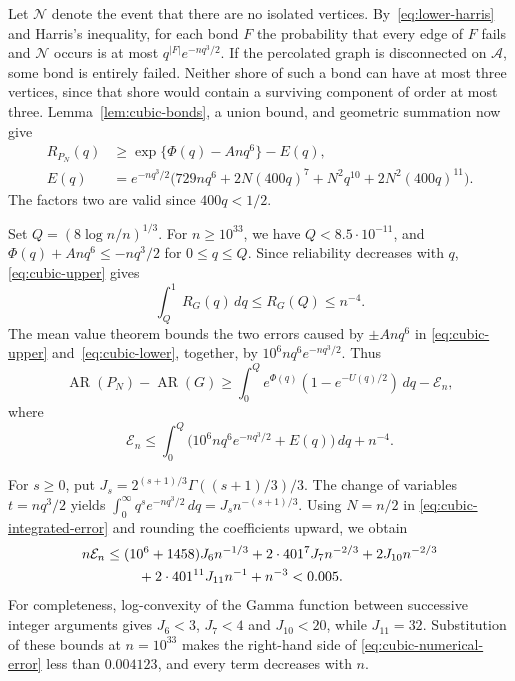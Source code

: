 \documentclass[11pt,reqno]{amsart}
\theoremstyle{remark}
\numberwithin{equation}{section}
\newcommand{\AR}{\operatorname{AR}}
\begin{document}
Let $\mathcal N$ denote the event that there are no isolated vertices. By~\eqref{eq:lower-harris} and Harris's inequality, for each bond $F$ the probability that every edge of $F$ fails and $\mathcal N$ occurs is at most $q^{|F|}e^{-nq^3/2}$. If the percolated
graph is disconnected on $\mathcal A$, some bond is entirely failed.
Neither shore of such a bond can have at most three vertices, since
that shore would contain a surviving component of order at most
three. Lemma~\ref{lem:cubic-bonds}, a union bound, and geometric
summation now give
\begin{align}
 R_{P_N}(q)&\ge \exp\{\Phi(q)-Anq^6\}-E(q),
       \label{eq:cubic-lower}\\
 E(q)&=e^{-nq^3/2}\bigl(729nq^6+2N(400q)^7
                    +N^2q^{10}+2N^2(400q)^{11}\bigr).
       \label{eq:cubic-error}
\end{align}
The factors two are valid since $400q<1/2$.

Set $Q=(8\log n/n)^{1/3}$. For $n\ge10^{33}$, we have
$Q<8.5\cdot10^{-11}$, and $\Phi(q)+Anq^6\le-nq^3/2$ for
$0\le q\le Q$. Since reliability decreases with $q$,
\eqref{eq:cubic-upper} gives
\begin{equation}\label{eq:cubic-tail}
 \int_Q^1 R_G(q)\,dq\le R_G(Q)\le n^{-4}.
\end{equation}
The mean value theorem bounds the two errors caused by $\pm Anq^6$
in \eqref{eq:cubic-upper} and~\eqref{eq:cubic-lower}, together, by
$10^6nq^6e^{-nq^3/2}$. Thus
\begin{equation}\label{eq:cubic-comparison}
 \AR(P_N)-\AR(G)
 \ge \int_0^Q e^{\Phi(q)}(1-e^{-U(q)/2})\,dq-\mathcal E_n,
\end{equation}
where
\begin{equation}\label{eq:cubic-integrated-error}
 \mathcal E_n\le
 \int_0^Q\bigl(10^6nq^6e^{-nq^3/2}+E(q)\bigr)\,dq+n^{-4}.
\end{equation}

For $s\ge0$, put
$J_s=2^{(s+1)/3}\Gamma((s+1)/3)/3$. The change of variables
$t=nq^3/2$ yields
$\int_0^\infty q^s e^{-nq^3/2}\,dq=J_sn^{-(s+1)/3}$.
Using $N=n/2$ in \eqref{eq:cubic-integrated-error} and rounding the
coefficients upward, we obtain
\begin{align}\label{eq:cubic-numerical-error}
 n\mathcal E_n\le{}&
 (10^6+1458)J_6n^{-1/3}
 +2\cdot401^7J_7n^{-2/3}
 +2J_{10}n^{-2/3}\notag\\
 &\quad+2\cdot401^{11}J_{11}n^{-1}+n^{-3}
 <0.005.
\end{align}
For completeness, log-convexity of the Gamma function between
successive integer arguments gives $J_6<3$, $J_7<4$ and $J_{10}<20$,
while $J_{11}=32$. Substitution of these bounds at $n=10^{33}$ makes
the right-hand side of \eqref{eq:cubic-numerical-error} less than
$0.004123$, and every term decreases with $n$.
\end{document}
